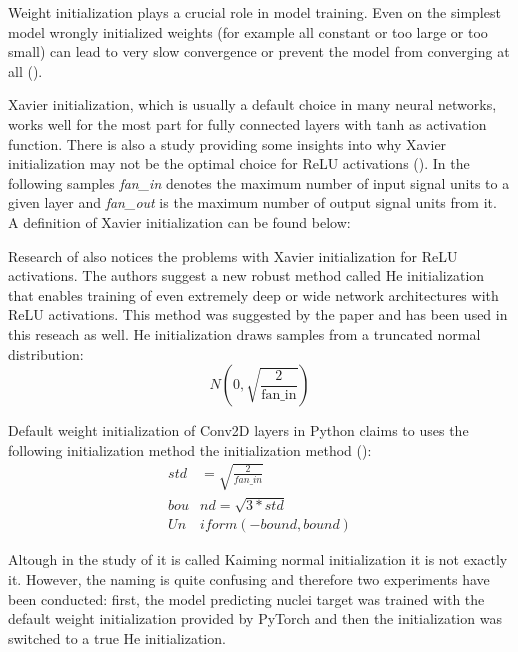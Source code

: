 Weight initialization plays a crucial role in model training. Even on the simplest model wrongly initialized weights (for example all constant or too large or too small) can lead to very slow convergence or prevent the model from converging at all (\cite{Kumar_2017}).

Xavier initialization, which is usually a default choice in many neural networks, works well for the most part for fully connected layers with tanh as activation function. There is also a study providing some insights into why Xavier initialization may not be the optimal choice for ReLU activations (\cite{Kumar_2017}). In the following samples \textit{fan\_in} denotes the maximum number of input signal units to a given layer and \textit{fan\_out} is the maximum number of output signal units from it. A definition of Xavier initialization can be found below:

Research of \cite{He_2015} also notices the problems with Xavier initialization for ReLU activations. The authors suggest a new robust method called He initialization that enables training of even extremely deep or wide network architectures with ReLU activations. This method was suggested by the \cite{Lachance_2020} paper and has been used in this reseach as well. He initialization draws samples from a truncated normal distribution:
\begin{equation}
	N(0, \sqrt{\frac{2}{\text{fan\_in}}})
\end{equation}

Default weight initialization of Conv2D layers in Python claims to uses the following initialization method the initialization method (\cite{He_2015}):
\begin{align}
	std &= \sqrt{\frac{2}{fan\_in}} \\
	bou&nd = \sqrt{3 * std} \\
	Un&iform(-bound, bound)
\end{align}

Altough in the study of \cite{He_2015} it is called Kaiming normal initialization it is not exactly it. However, the naming is quite confusing and therefore two experiments have been conducted: first, the model predicting nuclei target was trained with the default weight initialization provided by PyTorch and then the initialization was switched to a true He initialization.

